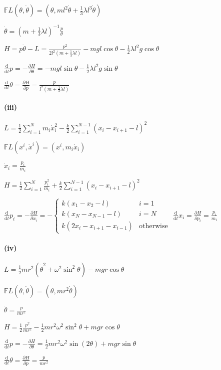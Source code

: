 \documentclass{ctexart}
\begin{document}
$\mathbb{F}L(\theta,\dot{\theta})=(\theta, ml^2\dot{\theta}+\frac{1}{3}\lambda l^3 \dot{\theta})$

$\dot{\theta}=(m+\frac{1}{3}\lambda l)^{-1} \frac{p}{\theta}$

$H=p \dot{\theta}-L=\frac{p^2}{2l^2 (m+ \frac{1}{3}\lambda l )}-mgl\cos\theta-\frac{1}{2}\lambda l^2 g\cos\theta$

$\frac{\mathrm{d}}{\mathrm{d}t}p= -\frac{\partial H}{\partial \theta}=-mgl\sin\theta-\frac{1}{2}\lambda l^2 g\sin\theta$

$\frac{\mathrm{d}}{\mathrm{d}t}\theta= \frac{\partial H}{\partial p}=\frac{p}{l^2(m+\frac{1}{3}\lambda l)}$

\paragraph{(iii)}
$L=\frac{1}{2}\sum\limits_{i=1}^N m_i \dot{x}_i^2-\frac{k}{2}\sum\limits_{i=1}^{N-1} (x_i-x_{i+1}-l)^2$

$\mathbb{F}L(x^i,\dot{x}^i)= (x^i, m_i\dot{x}_i)$

$\dot{x}_i=\frac{p_i}{m_i}$

$H=\frac{1}{2}\sum\limits_{i=1}^N \frac{p_i^2}{m_i}+\frac{k}{2}\sum\limits_{i=1}^{N-1}(x_i-x_{i+1}-l)^2$

$\frac{\mathrm{d}}{\mathrm{d}t}p_i=-\frac{\partial H}{\partial x_{i}}=-
\begin{cases}
  k(x_1-x_2-l) & i=1\\
  k(x_N-x_{N-1}-l) & i=N\\
  k(2x_i-x_{i+1}-x_{i-1}) & \text{otherwise}
\end{cases}
$
$\frac{\mathrm{d}}{\mathrm{d}t}x_i=\frac{\partial H}{\partial p_{i}}=\frac{p_i}{m_i}$

\paragraph{(iv)}
$L=\frac{1}{2}mr^2(\dot{\theta}^2+\omega^2 \sin^2\theta)-mgr\cos\theta$

$\mathbb{F}L(\theta,\dot{\theta})=(\theta, mr^2\dot{\theta})$

$\dot{\theta}=\frac{p}{mr^2}$

$H=\frac{1}{2}\frac{p^2}{mr^2}-\frac{1}{2}mr^2\omega^2\sin^2\theta+mgr\cos\theta$

$\frac{\mathrm{d}}{\mathrm{d}t}p=-\frac{\partial H}{\partial \theta}=\frac{1}{2}mr^2 \omega^2 \sin(2\theta)+mgr\sin\theta$

$\frac{\mathrm{d}}{\mathrm{d}t}\theta=\frac{\partial H}{\partial p}=\frac{p}{mr^2}$
\end{document}
